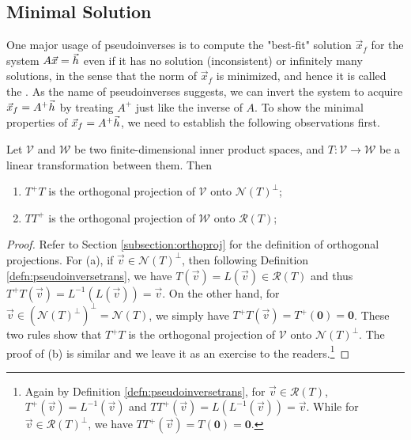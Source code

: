 \subsection{Minimal Solution}
\label{subsection:minsol}

One major usage of pseudoinverses is to compute the "best-fit" solution $\vec{x}_f$ for the system $A\vec{x} = \smash{\vec{h}}$ even if it has no solution (inconsistent) or infinitely many solutions, in the sense that the norm of $\vec{x}_f$ is minimized, and hence it is called the . As the name of pseudoinverses suggests, we can invert the system to acquire $\vec{x}_f = A^+\smash{\vec{h}}$ by treating $A^{+}$ just like the inverse of $A$. To show the minimal properties of $\vec{x}_f = A^+\smash{\vec{h}}$, we need to establish the following observations first.
\begin{proper}
\label{proper:minsollemma}
Let $\mathcal{V}$ and $\mathcal{W}$ be two finite-dimensional inner product spaces, and $T\colon \mathcal{V} \to \mathcal{W}$ be a linear transformation between them. Then
\begin{enumerate}[label=(\alph*)]
    \item $T^+ T$ is the orthogonal projection of $\mathcal{V}$ onto $\mathcal{N}(T)^\perp$;
    \item $T T^+$ is the orthogonal projection of $\mathcal{W}$ onto $\mathcal{R}(T)$;
\end{enumerate}
\end{proper}
\begin{proof}
Refer to Section \ref{subsection:orthoproj} for the definition of orthogonal projections. For (a), if $\vec{v} \in \mathcal{N}(T)^\perp$, then following Definition \ref{defn:pseudoinversetrans}, we have $T(\vec{v}) = L(\vec{v}) \in \mathcal{R}(T)$ and thus $T^+ T(\vec{v}) = L^{-1}(L(\vec{v})) = \vec{v}$. On the other hand, for $\vec{v} \in (\mathcal{N}(T)^\perp)^\perp = \mathcal{N}(T)$, we simply have $T^+ T(\vec{v}) = T^+(\textbf{0}) = \textbf{0}$. These two rules show that $T^+ T$ is the orthogonal projection of $\mathcal{V}$ onto $\mathcal{N}(T)^\perp$. The proof of (b) is similar and we leave it as an exercise to the readers.\footnote{Again by Definition \ref{defn:pseudoinversetrans}, for $\vec{v} \in \mathcal{R}(T)$, $T^+(\vec{v}) = L^{-1}(\vec{v})$ and $T T^+(\vec{v}) = L(L^{-1}(\vec{v})) = \vec{v}$. While for $\vec{v} \in \mathcal{R}(T)^\perp$, we have $T T^+(\vec{v}) = T(\textbf{0}) = \textbf{0}$.}
\end{proof} 
